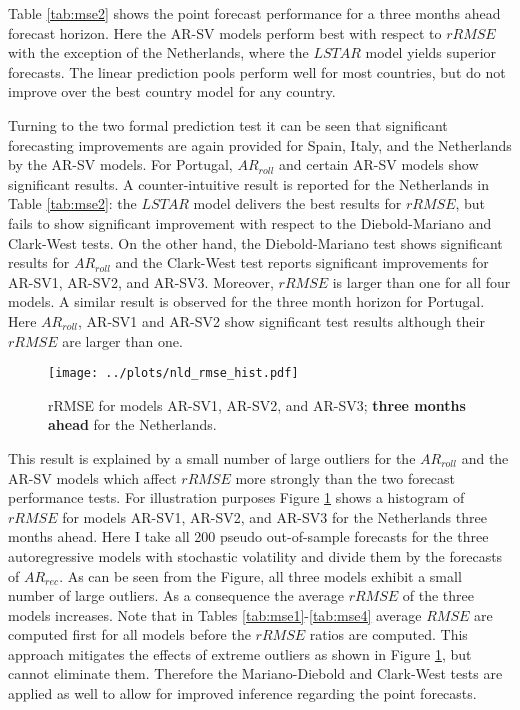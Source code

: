 \documentclass[12pt,letterpaper,fleqn]{article}           %
\begin{document}
Table \ref{tab:mse2} shows the point forecast performance for a three months ahead forecast horizon. Here the AR-SV models perform best with respect to $rRMSE$ with the exception of the Netherlands, where the $LSTAR$ model yields superior forecasts. The linear prediction pools perform well for most countries, but do not improve over the best country model for any country. 

Turning to the two formal prediction test it can be seen that significant forecasting improvements are again provided for Spain, Italy, and the Netherlands by the AR-SV models. For Portugal, $AR_{roll}$ and certain AR-SV models show significant results. A  counter-intuitive result is reported for the Netherlands in Table \ref{tab:mse2}: the $LSTAR$ model delivers the best results for $rRMSE$, but fails to show significant improvement with respect to the Diebold-Mariano and Clark-West tests. On the other hand, the Diebold-Mariano test shows significant results for $AR_{roll}$ and the Clark-West test reports significant improvements for AR-SV1, AR-SV2, and AR-SV3. Moreover, $rRMSE$ is larger than one for all four models. A similar result is observed for the three month horizon for Portugal. Here $AR_{roll}$, AR-SV1 and AR-SV2 show significant test results although their $rRMSE$ are larger than one. 

\begin{figure}
\centering \texttt{[image: ../plots/nld\_rmse\_hist.pdf]} 
\caption{rRMSE for models AR-SV1, AR-SV2, and AR-SV3; \textbf{three months ahead} for the Netherlands.}
\label{fig:hist_rmse_nld} 
\end{figure}
 

This result is explained by a small number of large outliers for the $AR_{roll}$ and the AR-SV models which affect $rRMSE$ more strongly than the two forecast performance tests. For illustration purposes Figure \ref{fig:hist_rmse_nld} shows a histogram of $rRMSE$ for models AR-SV1, AR-SV2, and AR-SV3 for the Netherlands three months ahead. Here I take all 200 pseudo out-of-sample forecasts for the three autoregressive models with stochastic volatility and divide them by the forecasts of $AR_{rec}$. As can be seen from the Figure, all three models exhibit a small number of large outliers. As a consequence the average $rRMSE$ of the three models increases. Note that in Tables \ref{tab:mse1}-\ref{tab:mse4} average $RMSE$ are computed first for all models before the $rRMSE$ ratios are computed. This approach mitigates the effects of extreme outliers as shown in Figure \ref{fig:hist_rmse_nld}, but cannot eliminate them. Therefore the Mariano-Diebold and Clark-West tests are applied as well to allow for improved inference regarding the point forecasts.
\end{document}
